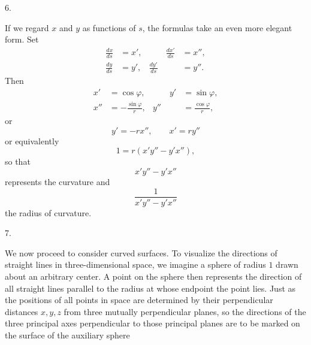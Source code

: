 %
\begin{center}6.\end{center}
\noindent\hspace*{1.2em}If we regard $x$ and $y$ as functions of $s$, the formulas take an even more elegant form. Set
\[
\begin{aligned}
\frac{dx}{ds}&=x',&\qquad \frac{dx'}{ds}&=x'',\\
\frac{dy}{ds}&=y',&\frac{dy'}{ds}&=y''.
\end{aligned}
\]
Then
\[
\begin{aligned}
x'&=\cos\varphi,&\qquad y'&=\sin\varphi,\\
x''&=-\frac{\sin\varphi}{r},&y''&=\frac{\cos\varphi}{r},
\end{aligned}
\]
or
\[
y'=-rx'',\qquad x'=ry''
\]
or equivalently
\[
1=r(x'y''-y'x''),
\]
so that
\[
x'y''-y'x''
\]
represents the curvature and
\[
\frac{1}{x'y''-y'x''}
\]
the radius of curvature.

\begin{center}7.\end{center}
\noindent\hspace*{1.2em}We now proceed to consider curved surfaces. To visualize the directions of straight lines in three-dimensional space, we imagine a sphere of radius $1$ drawn about an arbitrary center. A point on the sphere then represents the direction of all straight lines parallel to the radius at whose endpoint the point lies. Just as the positions of all points in space are determined by their perpendicular distances $x,y,z$ from three mutually perpendicular planes, so the directions of the three principal axes perpendicular to those principal planes are to be marked on the surface of the auxiliary sphere\space%
